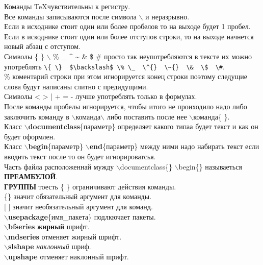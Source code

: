 \documentclass{article}
\newcommand{\bb}[1]{{\bfseries $\backslash$#1}} %
\begin{document}
Команды \TeX чувствительны к регистру.\\
Все команды записываются после символа $\backslash$ и неразрывно.\\
Если в исходнике стоит один или более пробелов то на выходе будет 1 пробел.\\
Если в искоднике стоит один или более отступов строки, то на выходе начнется новый абзац с отступом.\\

Символы  \{ \}  $\backslash$ \% \_  \^{}  \~{}  \&  \$  \# просто так неупотребляются в тексте их можно употреблять \verb|\{ \}  $\backslash$ \% \_  \^{}  \~{}  \&  \$  \#|.\\


\% коментарий строки при этом игнорируется конец строки поэтому следущие слова будут написаны слитно с предидущими.\\

Символы < > | + = - лучше употреблять только в формулах.\\

После команды пробелы игнорируется, чтобы итого  не проиходило надо либо заключить команду в   $\backslash$команда$\backslash$   либо поставить после нее   $\backslash$команда\{ \}.\\

Класс   \bb{documentclass}\{параметр\} определяет какого типаа будет текст и как он будет оформлен.\\

Класс \bb{begin}\{параметр\} \bb{end}\{параметр\} между ними надо набирать текст если вводить текст после то он будет игнорироватсья.\\

Часть файла расположеннай мужду   $\backslash$documentclass\{\}   $\backslash$begin\{\} называеться {\bfseries ПРЕАМБУЛОЙ}.\\

{\bfseries ГРУППЫ} тоесть \{ \} ограничивают действия команды.\\
\{\} значит обязательный аргумент для команды.\\
{[ ]} значит необязательный аргумент для команд.\\

\bb{usepackage}\{имя\_пакета\} подлкючает пакеты.\\
\bb{bfseries} {\bfseries жирный} шрифт.\\
\bb{mdseries} отменяет жирный шрифт.\\

\bb{slshape} {\slshape наклонный} шриф.\\
\bb{upshape} отменяет наклонный шрифт.\\
\end{document}
